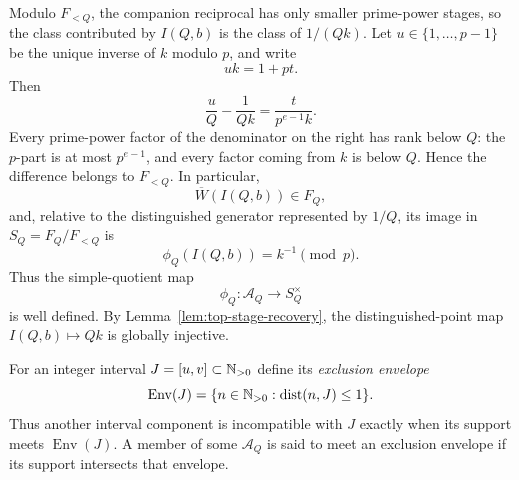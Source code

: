Modulo $F_{<Q}$, the companion reciprocal has only smaller prime-power stages, so the class contributed by $I(Q,b)$ is the class of $1/(Qk)$.  Let $u\in\{1,\ldots,p-1\}$ be the unique inverse of $k$ modulo $p$, and write
\[
uk=1+pt.
\]
Then
\begin{equation}\label{eq:simple-coordinate-calculation}
\frac{u}{Q}-\frac1{Qk}
=\frac{t}{p^{e-1}k}.
\end{equation}
Every prime-power factor of the denominator on the right has rank below $Q$: the $p$-part is at most $p^{e-1}$, and every factor coming from $k$ is below $Q$.  Hence the difference belongs to $F_{<Q}$.  In particular,
\begin{equation}\label{eq:signed-label-filtration}
\overline W(I(Q,b))\in F_Q,
\end{equation}
and, relative to the distinguished generator represented by $1/Q$, its image in $S_Q=F_Q/F_{<Q}$ is
\begin{equation}\label{eq:simple-value}
\phi_Q(I(Q,b))=k^{-1}\pmod p.
\end{equation}
Thus the simple-quotient map
\[
\phi_Q:\mathcal A_Q\longrightarrow S_Q^\times
\]
is well defined.  By Lemma~\ref{lem:top-stage-recovery}, the distinguished-point map $I(Q,b)\mapsto Qk$ is globally injective.

For an integer interval $J=[u,v]\subset\mathbb N_{>0}$ define its \emph{exclusion envelope}
\[
\operatorname{Env}(J)
=\{n\in\mathbb N_{>0}:\operatorname{dist}(n,J)\le1\}.
\]
Thus another interval component is incompatible with $J$ exactly when its support meets $\operatorname{Env}(J)$.  A member of some $\mathcal A_Q$ is said to meet an exclusion envelope if its support intersects that envelope.

